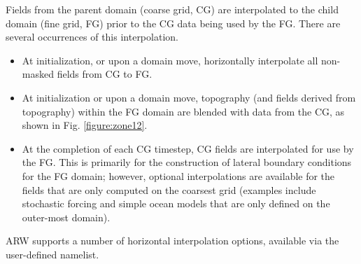 Fields from the parent domain (coarse grid, CG) are interpolated to the child domain 
(fine grid, FG) prior to the CG data being used by the FG. There are several 
occurrences of this interpolation.
\begin{itemize}\setlength{\parskip}{-4pt}
\item At initialization, or upon a domain move, horizontally interpolate all 
non-masked fields from CG to FG.
\item At initialization or upon a domain move, topography (and 
fields derived from topography) within the FG domain are blended 
with data from the CG, as shown in Fig. \ref{figure:zone12}.
\item At the completion of each CG timestep, CG fields are interpolated
for use by the FG. This is primarily for the construction of lateral boundary 
conditions for the FG domain; however, optional interpolations are available for the fields that are 
only computed on the coarsest grid (examples include stochastic forcing and 
simple ocean models that are only defined on the outer-most domain).
\end{itemize}
\noindent 
ARW supports a number of horizontal interpolation options, available via
the user-defined namelist.
